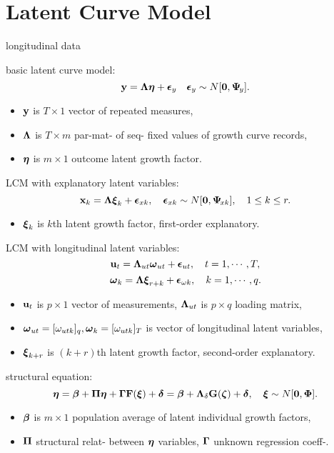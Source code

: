 \section*{Latent Curve Model}

longitudinal data

basic latent curve model: 
    \[\mathbf{y} = \boldsymbol{\Lambda} \boldsymbol{\eta} + \boldsymbol{\epsilon}_y\quad \boldsymbol{\epsilon}_y \sim {N}[\mathbf{0}, \boldsymbol{\Psi}_{\!y}].\]
\begin{itemize}
    \item $\mathbf{y}$ is $T \times 1$ vector of repeated measures,
    \item $\boldsymbol{\Lambda}$ is $T \times m$ par-mat- of seq- fixed values of growth curve records,
    \item $\boldsymbol{\eta}$ is $m \times 1$ outcome latent growth factor.
\end{itemize}

LCM with explanatory latent variables: 
    \[\mathbf{x}_k = \boldsymbol{\Lambda} \boldsymbol{\xi}_k + \boldsymbol{\epsilon}_{xk},\quad \boldsymbol{\epsilon}_{xk} \sim {N}[\mathbf{0}, \boldsymbol{\Psi}_{\!xk}],\quad 1 \leq k \leq r.\]
\begin{itemize}
    \item $\boldsymbol{\xi}_k$ is $k$th latent growth factor, first-order explanatory.
\end{itemize}

LCM with longitudinal latent variables:
    \[\mathbf{u}_t = \boldsymbol{\Lambda}_{ut} \boldsymbol{\omega}_{ut} + \boldsymbol{\epsilon}_{ut}, \quad t = 1, \cdots, T,\]
    \[\boldsymbol{\omega}_k = \boldsymbol{\Lambda} \boldsymbol{\xi}_{r+k} + \boldsymbol{\epsilon}_{\omega k}, \quad k = 1, \cdots, q.\]
    \begin{itemize}
        \item $\mathbf{u}_t$ is $p \times 1$ vector of measurements, $\boldsymbol{\Lambda}_{ut}$ is $p \times q$ loading matrix,
        \item $\boldsymbol{\omega}_{ut} = [\omega_{utk}]_{q}, \boldsymbol{\omega}_k = [\omega_{utk}]_{T}$ is vector of longitudinal latent variables,
        \item $\boldsymbol{\xi}_{k+r}$ is $(k+r)$th latent growth factor, second-order explanatory.
    \end{itemize}

structural equation: 
    \[\boldsymbol{\eta} = \boldsymbol{\beta} + \boldsymbol{\Pi} \boldsymbol{\eta} + \boldsymbol{\Gamma} \mathbf{F}(\boldsymbol{\xi}) + \boldsymbol{\delta} = \boldsymbol{\beta} + \boldsymbol{\Lambda}_\delta \mathbf{G}(\boldsymbol{\zeta}) + \boldsymbol{\delta}, 
    \quad \boldsymbol{\xi} \sim {N}[\mathbf{0}, \boldsymbol{\Phi}].\]
    \begin{itemize}
        \item $\boldsymbol{\beta}$ is $m \times 1$ population average of latent individual growth factors,
        \item $\boldsymbol{\Pi}$ structural relat- between $\boldsymbol{\eta}$ variables, $\boldsymbol{\Gamma}$ unknown regression coeff-.
    \end{itemize}

